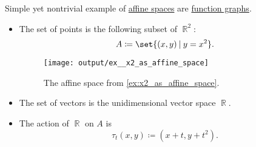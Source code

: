 \begin{example}\label{ex:x2_as_affine_space}
  Simple yet nontrivial example of \hyperref[def:affine_space]{affine spaces} are \hyperref[def:set_valued_map/graph]{function graphs}.
  \begin{itemize}
    \item The set of points is the following subset of \( \BbbR^2 \):
    \begin{equation*}
      A \coloneqq \set{ (x, y) \given y = x^2 }.
    \end{equation*}

    \begin{figure}[!ht]
      \centering
      \texttt{[image: output/ex\_\_x2\_as\_affine\_space]}
      \caption{The affine space from \cref{ex:x2_as_affine_space}.}\label{fig:ex:x2_as_affine_space}
    \end{figure}

    \item The set of vectors is the unidimensional vector space \( \BbbR \).

    \item The action of \( \BbbR \) on \( A \) is
    \begin{equation*}
      \tau_t(x, y) \coloneqq (x + t, y + t^2).
    \end{equation*}
  \end{itemize}
\end{example}

\begin{concept}\label{con:coordinate_systems}
\end{concept}

